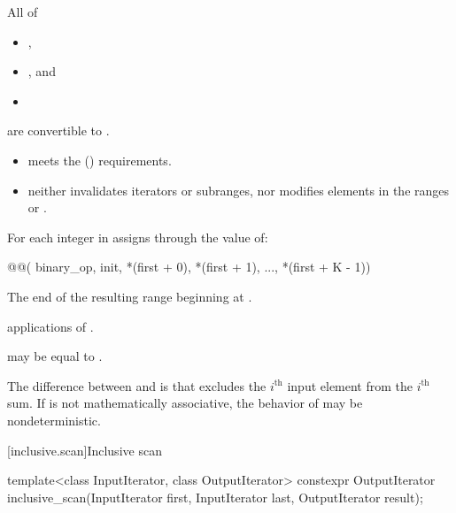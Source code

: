 \begin{itemdescr}
\pnum
\mandates
  All of
  \begin{itemize}
  \item {},
  \item {}, and
  \item {}
  \end{itemize}
  are convertible to .


\pnum
\expects
\begin{itemize}
\item
   meets the  () requirements.
\item
   neither invalidates iterators or subranges,
  nor modifies elements in
  the ranges  or .
\end{itemize}

\pnum
\effects
For each integer  in 
assigns through  the value of:
\begin{codeblock}
@@(
    binary_op, init, *(first + 0), *(first + 1), ..., *(first + K - 1))
\end{codeblock}

\pnum
\returns
The end of the resulting range beginning at .

\pnum
\complexity
{} applications of .

\pnum
\remarks
{} may be equal to .

\pnum
\begin{note}
The difference between  and  is
that  excludes the $i^\text{th}$ input element
from the $i^\text{th}$ sum.
If  is not mathematically associative,
the behavior of  may be nondeterministic.
\end{note}
\end{itemdescr}

[inclusive.scan]{Inclusive scan}

%
\begin{itemdecl}
template<class InputIterator, class OutputIterator>
  constexpr OutputIterator
    inclusive_scan(InputIterator first, InputIterator last,
                   OutputIterator result);
\end{itemdecl}

